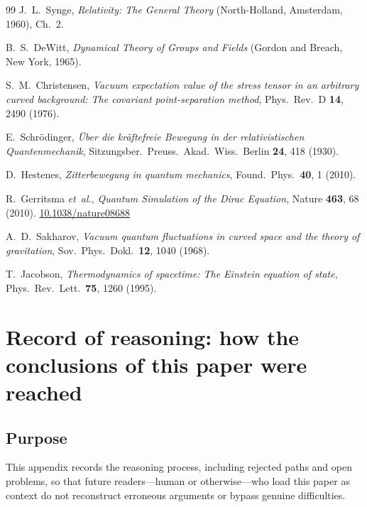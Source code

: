 \documentclass[%
 reprint, amsmath,amssymb, aps, prb, ]{revtex4-2}
\numberwithin{equation}{section}
\begin{document}
\begin{thebibliography}{99}
J.~L.~Synge, \textit{Relativity: The General Theory} (North-Holland, Amsterdam, 1960), Ch.~2.

B.~S.~DeWitt, \textit{Dynamical Theory of Groups and Fields} (Gordon and Breach, New York, 1965).

S.~M.~Christensen, \textit{Vacuum expectation value of the stress tensor in an arbitrary curved background: The covariant point-separation method}, Phys.\ Rev.\ D \textbf{14}, 2490 (1976).

E.~Schr\"{o}dinger, \textit{\"{U}ber die kr\"{a}ftefreie Bewegung in der relativistischen Quantenmechanik}, Sitzungsber.\ Preuss.\ Akad.\ Wiss.\ Berlin \textbf{24}, 418 (1930).

D.~Hestenes, \textit{Zitterbewegung in quantum mechanics}, Found.\ Phys.\ \textbf{40}, 1 (2010).

R.~Gerritsma \textit{et~al.}, \textit{Quantum Simulation of the Dirac Equation}, Nature \textbf{463}, 68 (2010). \href{https://doi.org/10.1038/nature08688}{10.1038/nature08688}

A.~D.~Sakharov, \textit{Vacuum quantum fluctuations in curved space and the theory of gravitation}, Sov.\ Phys.\ Dokl.\ \textbf{12}, 1040 (1968).

T.~Jacobson, \textit{Thermodynamics of spacetime: The Einstein equation of state}, Phys.\ Rev.\ Lett.\ \textbf{75}, 1260 (1995).

\end{thebibliography}


\appendix

\section{Record of reasoning: how the conclusions of this paper were reached}
\label{app:reasoning_record51}

\subsection{Purpose}
\label{app:purpose51}
This appendix records the reasoning process, including rejected paths and open problems, so that future readers---human or otherwise---who load this paper as context do not reconstruct erroneous arguments or bypass genuine difficulties.
\end{document}
